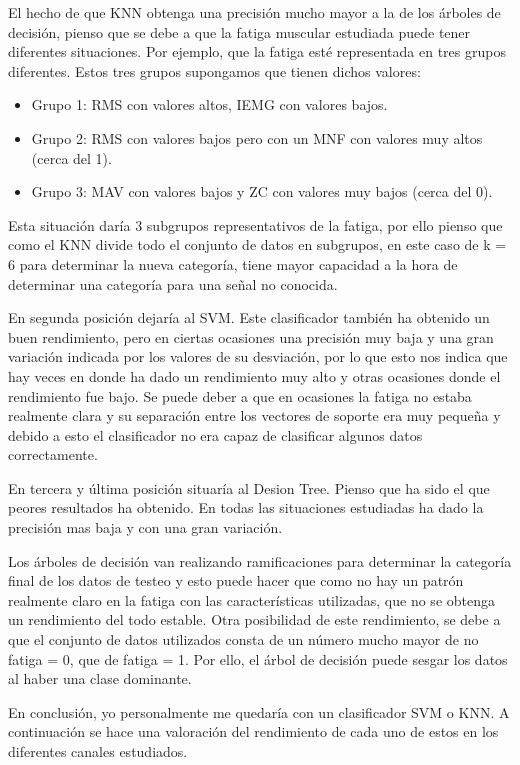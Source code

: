 El hecho de que KNN obtenga una precisión mucho mayor a la de los árboles de decisión, pienso que se debe a que la fatiga muscular estudiada puede tener diferentes situaciones. Por ejemplo, que la fatiga esté representada en tres grupos diferentes. Estos tres grupos supongamos que tienen dichos valores:
\begin{itemize}
\item Grupo 1: RMS con valores altos, IEMG con valores bajos.
\item Grupo 2: RMS con valores bajos pero con un MNF con valores muy altos (cerca del 1).
\item Grupo 3: MAV con valores bajos y ZC con valores muy bajos (cerca del 0).
\end{itemize}

Esta situación daría 3 subgrupos representativos de la fatiga, por ello pienso que como el KNN divide todo el conjunto de datos en subgrupos, en este caso de k = 6 para determinar la nueva categoría, tiene mayor capacidad a la hora de determinar una categoría para una señal no conocida.


En segunda posición dejaría al SVM. Este clasificador también ha obtenido un buen rendimiento, pero en ciertas ocasiones una precisión muy baja y una gran variación indicada por los valores de su desviación, por lo que esto nos indica que hay veces en donde ha dado un rendimiento muy alto y otras ocasiones donde el rendimiento fue bajo. Se puede deber a que en ocasiones la fatiga no estaba realmente clara y su separación entre los vectores de soporte era muy pequeña y debido a esto el clasificador no era capaz de clasificar algunos datos correctamente.

En tercera y última posición situaría al Desion Tree. Pienso que ha sido el que peores resultados ha obtenido. En todas las situaciones estudiadas ha dado la precisión mas baja y con una gran variación.

Los árboles de decisión van realizando ramificaciones para determinar la categoría final de los datos de testeo y esto puede hacer que como no hay un patrón realmente claro en la fatiga con las características utilizadas, que no se obtenga un rendimiento del todo estable. Otra posibilidad de este rendimiento, se debe a que el conjunto de datos utilizados consta de un número mucho mayor de no fatiga = 0, que de fatiga = 1. Por ello, el árbol de decisión puede sesgar los datos al haber una clase dominante.

En conclusión, yo personalmente me quedaría con un clasificador SVM o KNN. A continuación se hace una valoración del rendimiento de cada uno de estos en los diferentes canales estudiados.

